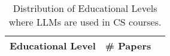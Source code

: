 \begin{table}[ht]
    \centering
    \caption{Distribution of Educational Levels where LLMs are used in CS courses.}
    \begin{tabular}{l c p{4cm}}
        \toprule
        \textbf{Educational Level} & \textbf{\# Papers} \\
        \midrule

\end{tabular}
\end{table}
